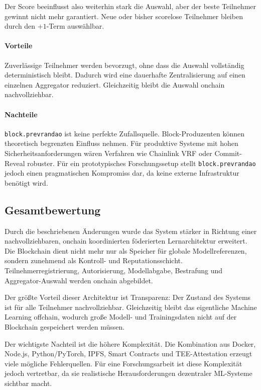 Der Score beeinflusst also weiterhin stark die Auswahl, aber der beste Teilnehmer gewinnt nicht mehr garantiert. Neue oder bisher scorelose Teilnehmer bleiben durch den \(+1\)-Term auswählbar.

\paragraph{Vorteile}
Zuverlässige Teilnehmer werden bevorzugt, ohne dass die Auswahl vollständig deterministisch bleibt. Dadurch wird eine dauerhafte Zentralisierung auf einen einzelnen Aggregator reduziert. Gleichzeitig bleibt die Auswahl onchain nachvollziehbar.

\paragraph{Nachteile}
\texttt{block.prevrandao} ist keine perfekte Zufallsquelle. Block-Produzenten können theoretisch begrenzten Einfluss nehmen. Für produktive Systeme mit hohen Sicherheitsanforderungen wären Verfahren wie Chainlink VRF oder Commit-Reveal robuster. Für ein prototypisches Forschungssetup stellt \texttt{block.prevrandao} jedoch einen pragmatischen Kompromiss dar, da keine externe Infrastruktur benötigt wird.

\subsection{Gesamtbewertung}

Durch die beschriebenen Änderungen wurde das System stärker in Richtung einer nachvollziehbaren, onchain koordinierten föderierten Lernarchitektur erweitert. Die Blockchain dient nicht mehr nur als Speicher für globale Modellreferenzen, sondern zunehmend als Kontroll- und Reputationsschicht. Teilnehmerregistrierung, Autorisierung, Modellabgabe, Bestrafung und Aggregator-Auswahl werden onchain abgebildet.

Der größte Vorteil dieser Architektur ist Transparenz: Der Zustand des Systems ist für alle Teilnehmer nachvollziehbar. Gleichzeitig bleibt das eigentliche Machine Learning offchain, wodurch große Modell- und Trainingsdaten nicht auf der Blockchain gespeichert werden müssen.

Der wichtigste Nachteil ist die höhere Komplexität. Die Kombination aus Docker, Node.js, Python/PyTorch, IPFS, Smart Contracts und TEE-Attestation erzeugt viele mögliche Fehlerquellen. Für eine Forschungsarbeit ist diese Komplexität jedoch vertretbar, da sie realistische Herausforderungen dezentraler ML-Systeme sichtbar macht.


